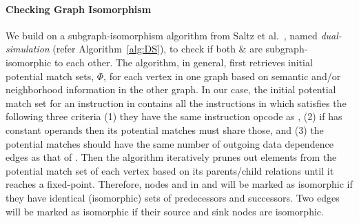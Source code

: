 \paragraph{Checking Graph Isomorphism}
%
We build on a subgraph-isomorphism algorithm from Saltz 
et al.~\cite{Saltz2014}, named 
\emph{dual-simulation} (refer Algorithm~\ref{alg:DS}),  to check if both \GN \& \GNP are 
subgraph-isomorphic to each other. The algorithm, in general, first 
retrieves initial potential match sets, $\Phi$,  for each vertex in one 
graph based on semantic and/or neighborhood information in the other graph.
In our case, the initial potential match set for an instruction 
\IN in \GN contains all the instructions in \GNP which satisfies the following 
three criteria (1) they have the same 
instruction opcode as \IN, (2) if \IN has constant operands then its potential 
matches must share those, and (3) the potential matches should have the same number
of outgoing data dependence edges as that of \IN. 
Then the algorithm iteratively prunes out elements from the 
potential match 
set of each vertex based on its parents/child relations until it reaches a 
fixed-point.
%
Therefore, nodes  and \Ap in \GN and \GNP will be marked as isomorphic if
they have identical (isomorphic) sets of predecessors and successors.
%
Two edges will be marked as isomorphic if their source and sink nodes are isomorphic.


